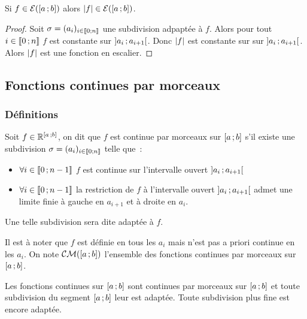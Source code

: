 \begin{prop}
  Si \(f \in \mathcal{E}(\left[ a \, ; {} b \right])\) alors \(\left\lvert f\right\rvert \in
  \mathcal{E}(\left[ a \, ; {} b \right])\).
\end{prop}
\begin{proof}
  Soit \(\sigma=(a_i)_{i \in \mathopen{\llbracket}0\mathclose{}\mathpunct{};n\mathclose{\rrbracket}}\) une subdivision adpaptée
  à \(f\). Alors pour tout \(i \in \mathopen{\llbracket}0\mathclose{}\mathpunct{};n\mathclose{\rrbracket}\) \(f\) est constante
  sur \(\left] a_i \, ; {} a_{i+1} \right[\). Donc \(\left\lvert f\right\rvert\) est constante sur sur
  \(\left] a_i \, ; {} a_{i+1} \right[\). Alors \(\left\lvert f\right\rvert\) est une fonction en
  escalier.
\end{proof}

\subsection{Fonctions continues par morceaux}

\subsubsection{Définitions}

\begin{defdef}
  Soit \(f \in \mathbb{R}^{\left[ a \, ; {} b \right]}\), on dit que \(f\) est continue par
  morceaux sur \(\left[ a \, ; {} b \right]\) s'il existe une subdivision
  \(\sigma=(a_i)_{i \in \mathopen{\llbracket}0\mathclose{}\mathpunct{};n\mathclose{\rrbracket}}\) telle que~:
  \begin{itemize}
    \item \(\forall i \in \mathopen{\llbracket}0\mathclose{}\mathpunct{};n-1\mathclose{\rrbracket}\) \(f\) est continue sur
      l'intervalle ouvert \(\left] a_i \, ; {} a_{i+1} \right[\)
    \item \(\forall i \in \mathopen{\llbracket}0\mathclose{}\mathpunct{};n-1\mathclose{\rrbracket}\) la restriction de \(f\) à
      l'intervalle ouvert \(\left] a_i \, ; {} a_{i+1} \right[\) admet une limite finie
      à gauche en \(a_{i+1}\) et à droite en \(a_i\).
  \end{itemize}
  Une telle subdivision sera dite adaptée à \(f\).
\end{defdef}

Il est à noter que \(f\) est définie en tous les \(a_i\) mais n'est pas a priori
continue en les \(a_i\). On note \(\mathcal{CM}(\left[ a \, ; {} b \right])\) l'ensemble des
fonctions continues par morceaux sur \(\left[ a \, ; {} b \right]\).

Les fonctions continues sur \(\left[ a \, ; {} b \right]\) sont continues par morceaux
sur \(\left[ a \, ; {} b \right]\) et toute subdivision du segment
\(\left[ a \, ; {} b \right]\) leur est adaptée. Toute subdivision plus fine est encore
adaptée.

